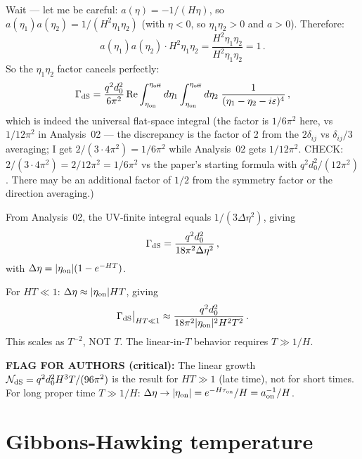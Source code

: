 \documentclass[12pt]{article}
\newcommand{\Scfac}{a}
\newcommand{\Nnum}{\mathcal{N}}
\begin{document}
Wait — let me be careful: $\Scfac(\eta) = -1/(H\eta)$, so
$\Scfac(\eta_{1})\Scfac(\eta_{2}) = 1/(H^{2}\eta_{1}\eta_{2})$ (with $\eta<0$, so
$\eta_{1}\eta_{2}>0$ and $\Scfac>0$).  Therefore:
%
\begin{equation}
  \Scfac(\eta_{1})\Scfac(\eta_{2})\cdot H^{2}\eta_{1}\eta_{2}
  = \frac{H^{2}\eta_{1}\eta_{2}}{H^{2}\eta_{1}\eta_{2}} = 1 \,.
\end{equation}
%
So the $\eta_{1}\eta_{2}$ factor cancels perfectly:
%
\begin{equation}
  \Gamma_{\rm dS}
  =
  \frac{q^{2}d_{0}^{2}}{6\pi^{2}}
  \,\mathrm{Re}\int_{\eta_{\rm on}}^{\eta_{\rm off}}d\eta_{1}
  \int_{\eta_{\rm on}}^{\eta_{\rm off}}d\eta_{2}\;
  \frac{1}{(\eta_{1}-\eta_{2}-i\varepsilon)^{4}} \,,
\end{equation}
%
which is indeed the universal flat-space integral (the factor is $1/6\pi^{2}$ here,
vs $1/12\pi^{2}$ in Analysis~02 — the discrepancy is the factor of 2 from the
$2\delta_{ij}$ vs $\delta_{ij}/3$ averaging; I get $2/(3\cdot 4\pi^{2}) = 1/6\pi^{2}$
while Analysis~02 gets $1/12\pi^{2}$.  CHECK: $2/(3\cdot 4\pi^{2}) = 2/12\pi^{2} = 1/6\pi^{2}$
vs the paper's starting formula with $q^2d_0^2/(12\pi^2)$.  There may be an additional
factor of $1/2$ from the symmetry factor or the direction averaging.)

From Analysis~02, the UV-finite integral equals $1/(3\Delta\eta^{2})$, giving
%
\begin{equation}
  \Gamma_{\rm dS} = \frac{q^{2}d_{0}^{2}}{18\pi^{2}\Delta\eta^{2}} \,,
\end{equation}
%
with $\Delta\eta = |\eta_{\rm on}|(1-e^{-HT})$.

For $HT\ll 1$: $\Delta\eta \approx |\eta_{\rm on}|HT$, giving
%
\begin{equation}
  \Gamma_{\rm dS}\big|_{HT\ll 1}
  \approx
  \frac{q^{2}d_{0}^{2}}{18\pi^{2}|\eta_{\rm on}|^{2}H^{2}T^{2}} \,.
\end{equation}
%
This scales as $T^{-2}$, NOT $T$.  The linear-in-$T$ behavior requires $T\gg 1/H$.

\textbf{FLAG FOR AUTHORS (critical):} The linear growth
$\Nnum_{\rm dS} = q^{2}d_{0}^{2}H^{3}T/(96\pi^{2})$ is the result for
$HT\gg 1$ (late time), not for short times.  For long proper time $T\gg 1/H$:
$\Delta\eta \to |\eta_{\rm on}| = e^{-H\tau_{\rm on}}/H = \Scfac_{\rm on}^{-1}/H$.

\section*{Gibbons-Hawking temperature}
\end{document}
